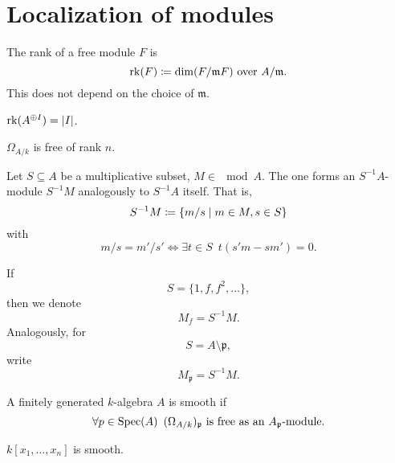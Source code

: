 \section{Localization of modules}

\begin{df}
  The rank of a free module $F$ is
  \[ \operatorname*{rk}(F) \coloneqq \dim(F / {\mathfrak m F}) \text{ over } A /{\mathfrak m}.\]
  This does not depend on the choice of $\mathfrak m$.
\end{df}

\begin{example}
  $ \operatorname*{rk}(A^{\oplus I}) = \lvert I\rvert$.
\end{example}

\begin{example}
  $\Omega_{A/{k}}$ is free of rank $n$.
\end{example}

\begin{df}
  Let $S \subseteq A$ be a multiplicative subset, $M \in \mod{A}$. The one forms an $S^{-1}A$-module $S^{-1}M$ analogously to $S^{-1}A$ itself. That is,
  \[ S^{-1}M \coloneqq \{ m / {s} \mathrel{|} m \in M, s \in S\}\]
  with
  \[ m / {s} = m' / {s'} \iff \exists t \in S \enspace t(s'm - sm') = 0.\]
\end{df}

\begin{example}
  If
  \[ S = \{1, f, f^2, \dotsc \},\]
  then we denote
  \[ M_f = S^{-1}M.\]
  Analogously, for
  \[ S = A \setminus \mathfrak p,\]
  write
  \[M_{\mathfrak p} = S^{-1}M.\]
\end{example}

\begin{df}
  A finitely generated $k$-algebra $A$ is smooth if
  \[ \forall p \in \text{Spec}(A) \enspace (\Omega_{A/{k}})_{\mathfrak p} \text{ is free as an $A_{\mathfrak p}$-module}.\]
\end{df}


\begin{example}
  $k[x_1, \dotsc, x_n]$ is smooth.
\end{example}

